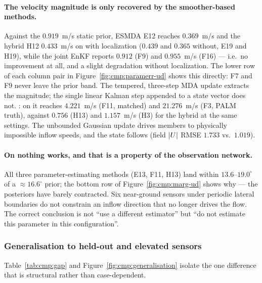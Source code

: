 \paragraph{The velocity magnitude is only recovered by the smoother-based
methods.} Against the $0.919$~m/s static prior, ESMDA E12 reaches $0.369$~m/s
and the hybrid H12 $0.433$~m/s on  with localization
($0.439$ and $0.365$ without, E19 and H19), while the joint EnKF reports
$0.912$ (F9) and $0.955$~m/s (F16) --- i.e.\ no improvement at all, and a
slight degradation without localization. The lower row of each column pair in
Figure~\ref{fig:cmp:paramerr-ud} shows this directly: F7 and F9 never leave the
prior band. The tempered, three-step MDA update extracts the magnitude; the
single linear Kalman step appended to a state vector does not. : on  it reaches $4.221$~m/s (F11, matched) and
$21.276$~m/s (F3, PALM truth), against $0.756$ (H13) and $1.157$~m/s (H3) for
the hybrid at the same settings. The unbounded Gaussian update drives members
to physically impossible inflow speeds, and the state follows (field $|U|$
RMSE $1.733$ vs.\ $1.019$).

\paragraph{On  nothing works, and that is a property of the
observation network.} All three parameter-estimating methods (E13, F11, H13)
land within $13.6$--$19.0^\circ$ of a $\approx 16.6^\circ$ prior; the bottom
row of Figure~\ref{fig:cmp:marg-ud} shows why --- the posteriors have barely
contracted. Six near-ground sensors
under periodic lateral boundaries do not constrain an inflow direction that no
longer drives the flow. The correct conclusion is not ``use a different
estimator'' but ``do not estimate this parameter in this configuration''.

\subsubsection{Generalisation to held-out and elevated sensors}
\label{sec:cmp:generalisation}

Table~\ref{tab:cmp:gap} and Figure~\ref{fig:cmp:generalisation} isolate the one
difference that is structural rather than case-dependent.

